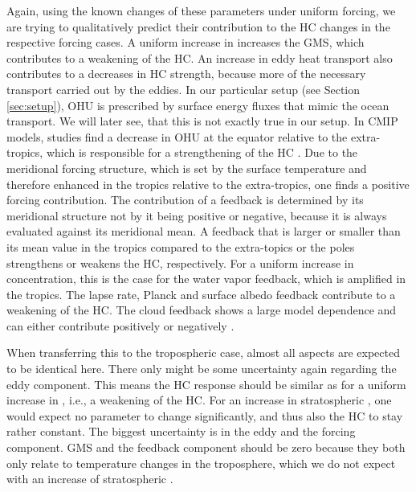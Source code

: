 Again, using the known changes of these parameters under uniform \CO{} forcing, we are trying to qualitatively predict their contribution to the HC changes in the respective forcing cases. A uniform increase in \CO{} increases the GMS, which contributes to a weakening of the HC. An increase in eddy heat transport also contributes to a decreases in HC strength, because more of the necessary transport carried out by the eddies. In our particular setup (see Section \ref{sec:setup}), OHU is prescribed by surface energy fluxes that mimic the ocean transport. We will later see, that this is not exactly true in our setup. In CMIP models, studies find a decrease in OHU at the equator relative to the extra-tropics, which is responsible for a strengthening of the HC \parencite{feldlCharacterizingHadleyCirculation2016}. Due to the meridional forcing structure, which is set by the surface temperature \parencite{jeevanjeeAnalyticalModelSpatially2021} and therefore enhanced in the tropics relative to the extra-tropics, one finds a positive forcing contribution.
The contribution of a feedback is determined by its meridional structure not by it being positive or negative, because it is always evaluated against its meridional mean. A feedback that is larger or smaller than its mean value in the tropics compared to the extra-topics or the poles strengthens or weakens the HC, respectively. For a uniform increase in \CO{} concentration, this is the case for the water vapor feedback, which is amplified in the tropics. The lapse rate, Planck and surface albedo feedback contribute to a weakening of the HC. The cloud feedback shows a large model dependence and can either contribute positively or negatively \parencite{feldlCharacterizingHadleyCirculation2016}.

When transferring this to the tropospheric \CO{} case, almost all aspects are expected to be identical here. There only might be some uncertainty again regarding the eddy component. This means the HC response should be similar as for a uniform increase in \CO{}, i.e., a weakening of the HC. For an increase in stratospheric \CO{}, one would expect no parameter to change significantly, and thus also the HC to stay rather constant. The biggest uncertainty is in the eddy and the forcing component. GMS and the feedback component should be zero because they both only relate to temperature changes in the troposphere, which we do not expect with an increase of stratospheric \CO.
